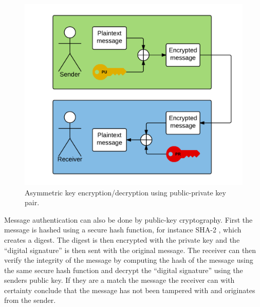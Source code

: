 \begin{figure}[h!]
  \captionsetup{justification=centering,margin=1.5cm}
  \caption{Asymmetric key encryption/decryption using public-private key pair.}
  \label{fig:encrypt_basic}
  \centering
    \includegraphics[width=1\textwidth]{images/encrypt_basic.png}
\end{figure}

Message authentication can also be done by public-key cryptography. First the message is hashed using a secure hash function, for instance SHA-2 \cite{shaRFC}, which creates a digest. The digest is then encrypted with the private key and the ``digital signature'' is then sent with the original message. The receiver can then verify the integrity of the message by computing the hash of the message using the same secure hash function and decrypt the ``digital signature'' using the senders public key. If they are a match the message the receiver can with certainty conclude that the message has not been tampered with and originates from the sender.

